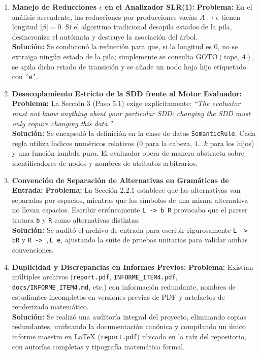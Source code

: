 \documentclass[11pt,a4paper]{article}
\begin{document}
\begin{enumerate}
    \item \textbf{Manejo de Reducciones $\epsilon$ en el Analizador SLR(1):}
    \textbf{Problema:} En el análisis ascendente, las reducciones por producciones vacías $A \rightarrow \epsilon$ tienen longitud $|\beta| = 0$. Si el algoritmo tradicional desapila estados de la pila, desincroniza el autómata y destruye la asociación del árbol.\\
    \textbf{Solución:} Se condicionó la reducción para que, si la longitud es 0, no se extraiga ningún estado de la pila; simplemente se consulta $\text{GOTO}(\text{tope}, A)$, se apila dicho estado de transición y se añade un nodo hoja hijo etiquetado con \texttt{'e'}.

    \item \textbf{Desacoplamiento Estricto de la SDD frente al Motor Evaluador:}
    \textbf{Problema:} La Sección 3 (Paso 5.1) exige explícitamente: \textit{``The evaluator must not know anything about your particular SDD: changing the SDD must only require changing this data.''}\\
    \textbf{Solución:} Se encapsuló la definición en la clase de datos \texttt{SemanticRule}. Cada regla utiliza índices numéricos relativos ($0$ para la cabeza, $1 \dots k$ para los hijos) y una función lambda pura. El evaluador opera de manera abstracta sobre identificadores de nodos y nombres de atributos arbitrarios.

    \item \textbf{Convención de Separación de Alternativas en Gramáticas de Entrada:}
    \textbf{Problema:} La Sección 2.2.1 establece que las alternativas van separadas por espacios, mientras que los símbolos de una misma alternativa no llevan espacios. Escribir erróneamente \texttt{L -> b R} provocaba que el parser tratara \texttt{b} y \texttt{R} como alternativas distintas.\\
    \textbf{Solución:} Se auditó el archivo de entrada para escribir rigurosamente \texttt{L -> bR} y \texttt{R -> ,L e}, ajustando la suite de pruebas unitarias para validar ambas convenciones.

    \item \textbf{Duplicidad y Discrepancias en Informes Previos:}
    \textbf{Problema:} Existían múltiples archivos (\texttt{report.pdf}, \texttt{INFORME\_ITEM4.pdf}, \texttt{docs/INFORME\_ITEM4.md}, etc.) con información redundante, nombres de estudiantes incompletos en versiones previas de PDF y artefactos de renderizado matemático.\\
    \textbf{Solución:} Se realizó una auditoría integral del proyecto, eliminando copias redundantes, unificando la documentación canónica y compilando un único informe maestro en \LaTeX{} (\texttt{report.pdf}) ubicado en la raíz del repositorio, con autorías completas y tipografía matemática formal.
\end{enumerate}
\end{document}
